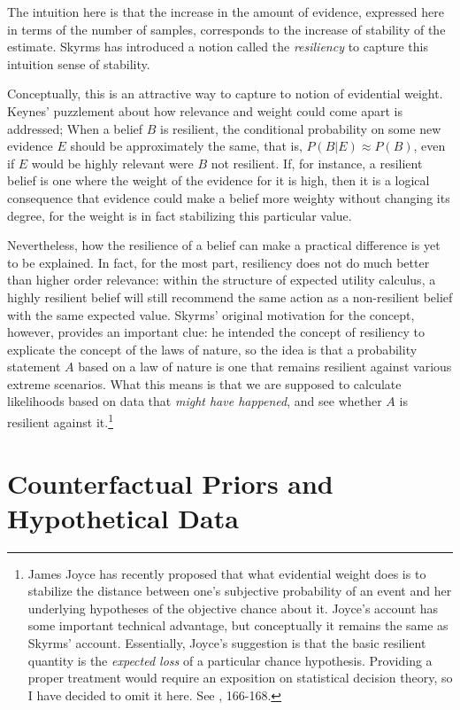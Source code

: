 The intuition here is that the increase in the amount of evidence,
expressed here in terms of the number of samples, corresponds to the
increase of stability of the estimate. Skyrms has introduced a notion
called the \emph{resiliency} to capture this intuition sense of
stability.

Conceptually, this is an attractive way to capture to notion of
evidential weight. Keynes' puzzlement about how relevance and weight
could come apart is addressed; When a belief \(B\) is resilient, the
conditional probability on some new evidence \(E\) should be
approximately the same, that is, \(P(B|E) \approx P(B)\), even if \(E\)
would be highly relevant were \(B\) not resilient. If, for instance, a
resilient belief is one where the weight of the evidence for it is high,
then it is a logical consequence that evidence could make a belief more
weighty without changing its degree, for the weight is in fact
stabilizing this particular value.

Nevertheless, how the resilience of a belief can make a practical
difference is yet to be explained. In fact, for the most part,
resiliency does not do much better than higher order relevance: within
the structure of expected utility calculus, a highly resilient belief
will still recommend the same action as a non-resilient belief with the
same expected value. Skyrms' original motivation for the concept,
however, provides an important clue: he intended the concept of
resiliency to explicate the concept of the laws of nature, so the idea
is that a probability statement \(A\) based on a law of nature is one
that remains resilient against various extreme scenarios. What this
means is that we are supposed to calculate likelihoods based on data
that \emph{might have happened}, and see whether \(A\) is resilient
against it.\footnote{James Joyce has recently proposed that what evidential weight does is to stabilize the distance between one's subjective probability of an event and her underlying hypotheses of the objective chance about it. Joyce's account has some important technical advantage, but conceptually it remains the same as Skyrms' account. Essentially, Joyce's suggestion is that the basic resilient quantity is the \emph{expected loss} of a particular chance hypothesis. Providing a proper treatment would require an exposition on statistical decision theory, so I have decided to omit it here. See \cite{joycehpre}, 166-168.}



\hypertarget{counterfactual-priors-and-hypothetical-data-1}{%
\section{Counterfactual Priors and Hypothetical
Data}\label{counterfactual-priors-and-hypothetical-data-1}}

